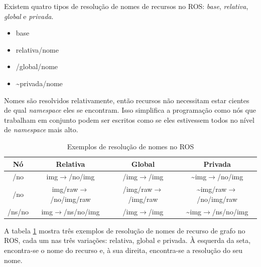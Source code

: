                 Existem quatro tipos de resolução de nomes de recursos no ROS: \textit{base}, \textit{relativa}, \textit{global} e \textit{privada}.
                
                \begin{itemize}
                    \item base
                    
                    \item relativa/nome
                    
                    \item /global/nome
                    
                    \item \textasciitilde privada/nome
                \end{itemize}
                
                Nomes são resolvidos relativamente, então recursos não necessitam estar cientes de qual \textit{namespace} eles se encontram. Isso simplifica a programação como nós que trabalham em conjunto podem ser escritos como se eles estivessem todos no nível de \textit{namespace} mais alto.
                
                \begin{table}[hbt]
                    \setlength\extrarowheight{4pt}
                    \centering
                    \caption{Exemplos de resolução de nomes no ROS}
                    \label{tab:ros_nomes}
                    \begin{tabular}{c c c c}
                        \toprule
                        \textbf{Nó} & \textbf{Relativa} &  \textbf{Global} & \textbf{Privada} \\
                        \midrule
                        /no & img$\to$/no/img & /img$\to$/img & \textasciitilde img$\to$/no/img \\
                        /no & img/raw$\to$/no/img/raw & /img/raw$\to$/img/raw & \textasciitilde img/raw$\to$/no/img/raw \\
                        /ns/no & img$\to$/ns/no/img & /img$\to$/img & \textasciitilde img$\to$/ns/no/img \\
                        \bottomrule
                    \end{tabular}
                \end{table}
                
                A tabela \ref{tab:ros_nomes} mostra três exemplos de resolução de nomes de recurso de grafo no ROS, cada um nas três variações: relativa, global e privada. À esquerda da seta, encontra-se o nome do recurso e, à sua direita, encontra-se a resolução do seu nome. 
                
